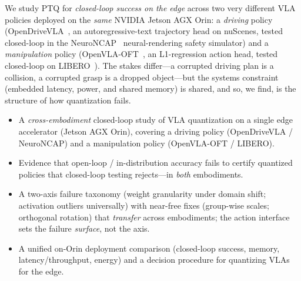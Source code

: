 \documentclass[conference]{IEEEtran}
\begin{document}
We study PTQ for \emph{closed-loop success on the edge} across two very different VLA policies deployed
on the \emph{same} NVIDIA Jetson AGX Orin: a \emph{driving} policy (OpenDriveVLA~\cite{opendrivevla},
an autoregressive-text trajectory head on nuScenes, tested closed-loop in the
NeuroNCAP~\cite{neuroncap} neural-rendering safety simulator) and a \emph{manipulation} policy
(OpenVLA-OFT~\cite{oft}, an L1-regression action head, tested closed-loop on
LIBERO~\cite{libero}). The stakes differ---a corrupted driving plan is a collision, a corrupted grasp
is a dropped object---but the systems constraint (embedded latency, power, and shared memory) is
shared, and so, we find, is the structure of how quantization fails.

\begin{itemize}
\item A \emph{cross-embodiment} closed-loop study of VLA quantization on a single edge accelerator
(Jetson AGX Orin), covering a driving policy (OpenDriveVLA / NeuroNCAP) and a manipulation policy
(OpenVLA-OFT / LIBERO).
\item Evidence that open-loop / in-distribution accuracy fails to certify quantized policies that
closed-loop testing rejects---in \emph{both} embodiments.
\item A two-axis failure taxonomy (weight granularity under domain shift; activation outliers
universally) with near-free fixes (group-wise scales; orthogonal rotation) that \emph{transfer}
across embodiments; the action interface sets the failure \emph{surface}, not the axis.
\item A unified on-Orin deployment comparison (closed-loop success, memory, latency/throughput,
energy) and a decision procedure for quantizing VLAs for the edge.
\end{itemize}
\end{document}
